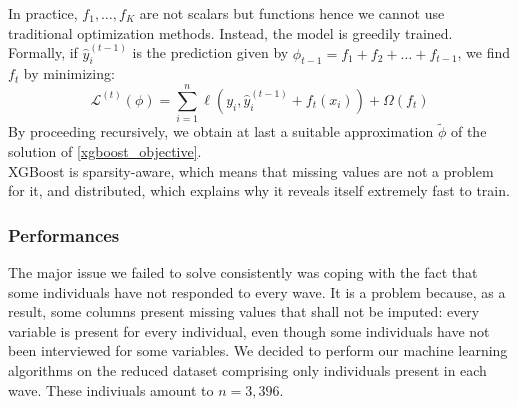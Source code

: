 \documentclass[]{article}
\begin{document}
\noindent
In practice, $f_1,\dots,f_K$ are not scalars but functions hence we cannot use traditional optimization methods. Instead, the model is greedily trained. Formally, if $\hat{y}^{(t-1)}_i$ is the prediction given by $\phi_{t-1} = f_1 + f_2 + \dots + f_{t-1}$, we find $f_t$ by minimizing:
\begin{equation}
	\mathcal{L}^{(t)}(\phi) = \sum_{i=1}^n \ell(y_i, \hat{y}^{(t-1)}_i + f_t(x_i)) + \Omega(f_t)
\end{equation}
By proceeding recursively, we obtain at last a suitable approximation $\tilde{\phi}$ of the solution of \eqref{xgboost_objective}.\\
XGBoost is sparsity-aware, which means that missing values are not a problem for it, and distributed, which explains why it reveals itself extremely fast to train.

\subsubsection{Performances}
\label{xgboost_performances}
The major issue we failed to solve consistently was coping with the fact that some individuals have not responded to every wave. It is a problem because, as a result, some columns present missing values that shall not be imputed: every variable is present for every individual, even though some individuals have not been interviewed for some variables. We decided to perform our machine learning algorithms on the reduced dataset comprising only individuals present in each wave. These indiviuals amount to $n = 3,396$.\\
\end{document}
